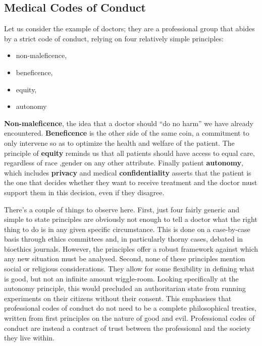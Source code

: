 \documentclass[
]{book}
\providecommand{\tightlist}{%
  \setlength{\itemsep}{0pt}\setlength{\parskip}{0pt}}
\theoremstyle{definition}
\theoremstyle{definition}
\theoremstyle{definition}
\theoremstyle{definition}
\theoremstyle{remark}
\begin{document}
\hypertarget{medical-codes-of-conduct}{%
\subsection{Medical Codes of Conduct}\label{medical-codes-of-conduct}}

Let us consider the example of doctors; they are a professional group that abides by a strict code of conduct, relying on four relatively simple principles:

\begin{itemize}
\tightlist
\item
  non-maleficence,
\item
  beneficence,
\item
  equity,
\item
  autonomy
\end{itemize}

\textbf{Non-maleficence}, the idea that a doctor should ``do no harm'' we have already encountered. \textbf{Beneficence} is the other side of the same coin, a commitment to only intervene so as to optimize the health and welfare of the patient. The principle of \textbf{equity} reminds us that all patients should have access to equal care, regardless of race ,gender on any other attribute. Finally patient \textbf{autonomy}, which includes \textbf{privacy} and medical \textbf{confidentiality} asserts that the patient is the one that decides whether they want to receive treatment and the doctor must support them in this decision, even if they disagree.

There's a couple of things to observe here. First, just four fairly generic and simple to state principles are obviously not enough to tell a doctor what the right thing to do is in any given specific circumstance. This is done on a case-by-case basis through ethics committees and, in particularly thorny cases, debated in bioethics journals. However, the principles offer a robust framework against which any new situation must be analysed. Second, none of these principles mention social or religious considerations. They allow for some flexibility in defining what is good, but not an infinite amount wiggle-room. Looking specifically at the autonomy principle, this would precluded an authoritarian state from running experiments on their citizens without their consent. This emphasises that professional codes of conduct do not need to be a complete philosophical treaties, written from first principles on the nature of good and evil. Professional codes of conduct are instead a contract of trust between the professional and the society they live within.
\end{document}
